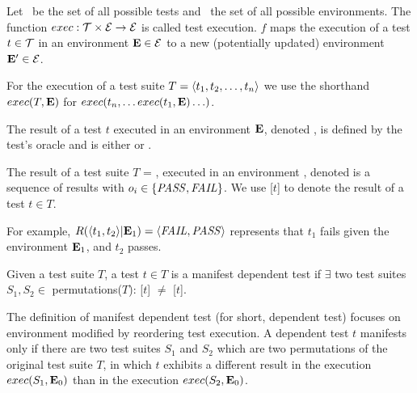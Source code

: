 \begin{definition}
Let\/ \alltests\ be the set of all possible
tests and\/ \environs\ the set of all possible
environments.
The function\/ $exec: \mathcal{T} \times \mathcal{E} \rightarrow
\mathcal{E}$ is called test
execution. $f$ maps the execution of a test\/ $ t \in
\mathcal{T}$ 
in an environment\/ $\mathbf{E} \in \mathcal{E}$ to a new (potentially updated)
environment\/ $\mathbf{E}' \in \mathcal{E}$.

For the execution of a test suite\/ $T =  \langle t_1, t_2, \dots, t_n \rangle $
we use the shorthand\/
$exec(T,\mathbf{E})$ for $exec(t_n,{\dots exec(t_1,\mathbf{E}) \dots })$.
\end{definition}

\begin{definition}
The result of a test $t$ executed in an environment\/ $\mathbf{E}$,
denoted\/ , is defined by the test's oracle
and is either \pass or \fail.

The result of a test suite\/ $T$ = , executed in an
environment\/ \env, denoted\/  is a
sequence of results\/  with $o_i \in \{\mathit{PASS},\mathit{FAIL}\}$.
We use [$t$] to denote the result of a test $t \in T$.


For example, $R( \langle t_1, t_2 \rangle |\mathbf{E}_1) =  \langle \mathit{FAIL}, \mathit{PASS} \rangle $ represents that 
$t_1$ fails given the environment\/ $\mathbf{E}_1$, and\/ $t_2$ passes.
\end{definition}



\begin{definition} \label{def:manifest}
Given a test suite\/ $T$, a test $t \in T$ is a
manifest dependent test if $\exists$ two test suites
$S_1, S_2 \in$ permutations($T$):
[$t$] $\neq$
[$t$].
%
\end{definition}


The definition of manifest dependent test (for short, dependent test)
focuses on environment modified by reordering test execution.
A dependent test $t$ manifests only
if there are two test suites $S_1$ and $S_2$ which
are two permutations of the original test suite $T$,
in which $t$ exhibits a different result
in the execution $exec(S_1,\mathbf{E}_0)$
than in the execution $exec(S_2,\mathbf{E}_0)$.


